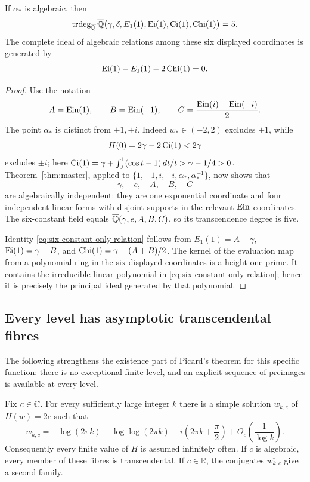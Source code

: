\begin{corollary}
\label{cor:witness-six-constant-field}
If $\alpha_*$ is algebraic, then
\[
 \operatorname{trdeg}_{\overline{\mathbb Q}}
 \overline{\mathbb Q}\bigl(\gamma,\delta,E_1(1),\operatorname{Ei}(1),\operatorname{Ci}(1),\operatorname{Chi}(1)\bigr)=5.
\]
The complete ideal of algebraic relations among these six displayed
coordinates is generated by
\begin{equation}\label{eq:six-constant-only-relation}
 \operatorname{Ei}(1)-E_1(1)-2\operatorname{Chi}(1)=0.
\end{equation}
\end{corollary}

\begin{proof}
Use the notation
\[
 A=\operatorname{Ein}(1),\qquad B=\operatorname{Ein}(-1),\qquad
 C=\frac{\operatorname{Ein}(i)+\operatorname{Ein}(-i)}2.
\]
The point $\alpha_*$ is distinct from $\pm1,\pm i$.  Indeed
$w_*\in(-2,2)$ excludes $\pm1$, while
\[
 H(0)=2\gamma-2\operatorname{Ci}(1)<2\gamma
\]
excludes $\pm i$; here
$\operatorname{Ci}(1)=\gamma+\int_0^1(\cos t-1)\,dt/t>\gamma-1/4>0$.
Theorem~\ref{thm:master}, applied to
$\{1,-1,i,-i,\alpha_*,\alpha_*^{-1}\}$, now shows that
\[
 \gamma,\quad e,\quad A,\quad B,\quad C
\]
are algebraically independent: they are one exponential coordinate and
four independent linear forms with disjoint supports in the relevant
$\operatorname{Ein}$-coordinates.  The six-constant field equals
$\overline{\mathbb Q}(\gamma,e,A,B,C)$, so its transcendence degree is five.

Identity \eqref{eq:six-constant-only-relation} follows from
$E_1(1)=A-\gamma$, $\operatorname{Ei}(1)=\gamma-B$, and
$\operatorname{Chi}(1)=\gamma-(A+B)/2$.  The kernel of the evaluation map from a
polynomial ring in the six displayed coordinates is a height-one prime.
It contains the irreducible linear polynomial in
\eqref{eq:six-constant-only-relation}; hence it is precisely the principal
ideal generated by that polynomial.
\end{proof}

\subsection{Every level has asymptotic transcendental fibres}

The following strengthens the existence part of Picard's theorem for this
specific function: there is no exceptional finite level, and an explicit
sequence of preimages is available at every level.

\begin{theorem}
\label{thm:H-level-asymptotics}
Fix $c\in\mathbb C$.  For every sufficiently large integer $k$ there is a simple
solution $w_{k,c}$ of $H(w)=2c$ such that
\begin{equation}\label{eq:H-level-zero-asymptotic}
 w_{k,c}
 =-\log(2\pi k)-\log\log(2\pi k)
  +i\left(2\pi k+\frac\pi2\right)
  +O_c\!\left(\frac1{\log k}\right).
\end{equation}
Consequently every finite value of $H$ is assumed infinitely often.  If
$c$ is algebraic, every member of these fibres is transcendental.  If
$c\in\mathbb R$, the conjugates $\overline{w_{k,c}}$ give a second family.
\end{theorem}

